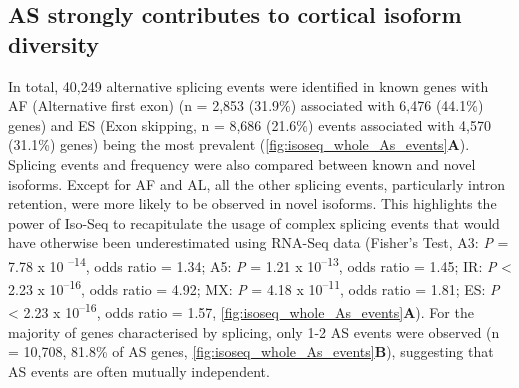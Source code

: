 \subsection{AS strongly contributes to cortical isoform diversity}
\label{ch4_AS}
In total, 40,249 alternative splicing events were identified in known genes with AF (Alternative first exon) (n = 2,853 (31.9\%) associated with 6,476 (44.1\%) genes) and ES (Exon skipping, n = 8,686 (21.6\%) events associated with 4,570 (31.1\%) genes) being the most prevalent (\cref{fig:isoseq_whole_As_events}\textbf{A}). Splicing events and frequency were also compared between known and novel isoforms. Except for AF and AL, all the other splicing events, particularly intron retention, were more likely to be observed in novel isoforms. This highlights the power of Iso-Seq to recapitulate the usage of complex splicing events that would have otherwise been underestimated using RNA-Seq data (Fisher's Test, A3: \textit{P} = 7.78 x 10 \textsuperscript{–14}, odds ratio = 1.34; A5: \textit{P} = 1.21 x 10\textsuperscript{–13}, odds ratio = 1.45; IR: \textit{P} < 2.23 x 10\textsuperscript{–16}, odds ratio = 4.92; MX: \textit{P} = 4.18 x 10\textsuperscript{–11}, odds ratio = 1.81; ES: \textit{P} < 2.23 x 10\textsuperscript{–16}, odds ratio = 1.57, \cref{fig:isoseq_whole_As_events}\textbf{A}). For the majority of genes characterised by splicing, only 1-2 AS events were observed (n = 10,708, 81.8\% of AS genes, \cref{fig:isoseq_whole_As_events}\textbf{B}), suggesting that AS events are often mutually independent. 

